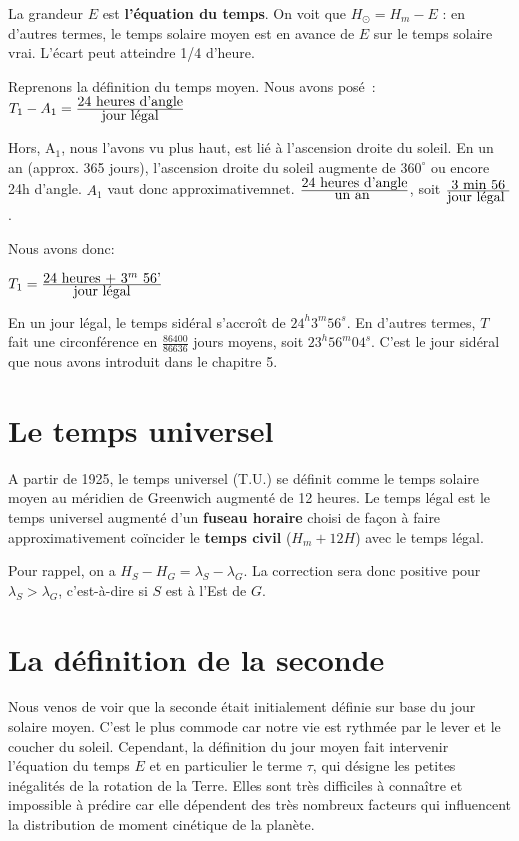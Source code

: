 \documentclass[12pt]{report}
\def\sun{\odot}
\begin{document}
La grandeur $E$ est \textbf{l'équation du temps}. On voit que $H_\sun = H_m - E$ : en d'autres termes, le temps solaire moyen est en avance de  $E$ sur le temps solaire vrai. L'écart peut atteindre 1/4 d'heure.


Reprenons la d\'efinition du temps moyen. Nous avons pos\'e~:  $T_1 - A_1 =
{\mbox{24 heures d'angle}\over \mbox{jour l\'egal}}$


Hors, A$_1$, nous l'avons vu plus haut, est li\'e \`a l'ascension droite du soleil. En un an (approx. 365 jours), l'ascension droite du soleil augmente de $360^\circ$ ou encore 24h d'angle.  $A_1$ vaut donc approximativemnet.
${\mbox{24 heures d'angle}\over \mbox{un an }}$, soit 
${\mbox{3 min 56}\over \mbox{jour l\'egal }}$. 

Nous avons donc: 

$T_1 = {\mbox{24 heures + 3$^m$ 56'} \over \mbox{jour légal}}$

En un jour légal, le temps sidéral s'accroît de $24^h3^m56^s$. En d'autres termes, $T$ fait une circonférence en $\frac{86400}{86636}$ jours moyens, soit $23^h56^m04^s$. C'est le jour sidéral que nous avons introduit dans le chapitre 5.

\section{Le temps universel}

A partir de 1925, le temps universel (T.U.) se définit comme le temps solaire moyen au méridien de Greenwich augmenté de 12 heures. Le temps légal est le temps universel augmenté d'un \textbf{fuseau horaire} choisi de façon à faire approximativement coïncider le \textbf{temps civil} ($H_m + 12H$) avec le temps légal.

Pour rappel, on a $H_S-H_G=\lambda_S-\lambda_G$. La correction sera donc positive pour $\lambda_S > \lambda_G$, c'est-à-dire si $S$ est à l'Est de $G$. 


\section{La définition de la seconde}
Nous venos de voir que la seconde était initialement définie sur base du jour solaire moyen. C'est le plus commode car notre vie est rythmée par le lever et le coucher du soleil. Cependant, la définition du jour moyen fait intervenir l'équation du temps $E$ et en particulier le terme $\tau$, qui désigne les petites inégalités de la rotation de la Terre. Elles sont très difficiles à connaître et impossible à prédire car elle dépendent des très nombreux facteurs qui influencent la distribution de moment cinétique de la planète. 
\end{document}

